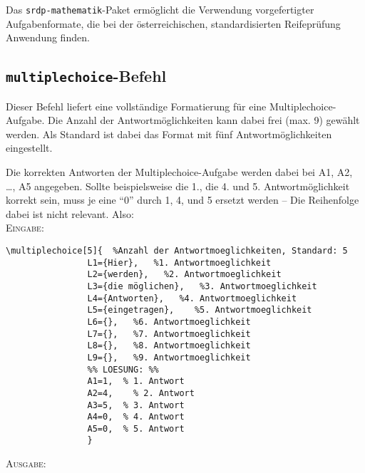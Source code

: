 \documentclass[a4paper,12pt]{article}
\begin{document}
Das \texttt{srdp-mathematik}-Paket ermöglicht die Verwendung vorgefertigter Aufgabenformate, die bei der österreichischen, standardisierten Reifeprüfung Anwendung finden.


\subsection{\texttt{multiplechoice}-Befehl}

Dieser Befehl liefert eine vollständige Formatierung für eine Multiplechoice-Aufgabe. Die Anzahl der Antwortmöglichkeiten kann dabei frei (max. 9) gewählt werden. Als Standard ist dabei das Format mit fünf Antwortmöglichkeiten eingestellt. \leer

Die korrekten Antworten der Multiplechoice-Aufgabe werden dabei bei A1, A2, \ldots, A5 angegeben. Sollte beispielsweise die 1., die 4. und 5. Antwortmöglichkeit korrekt sein, muss je eine "`0"' durch 1, 4, und 5 ersetzt werden -- Die Reihenfolge dabei ist nicht relevant. Also: \\

\textsc{Eingabe:}

\begin{verbatim}
\multiplechoice[5]{  %Anzahl der Antwortmoeglichkeiten, Standard: 5
				L1={Hier},   %1. Antwortmoeglichkeit 
				L2={werden},   %2. Antwortmoeglichkeit
				L3={die möglichen},   %3. Antwortmoeglichkeit
				L4={Antworten},   %4. Antwortmoeglichkeit
				L5={eingetragen},	 %5. Antwortmoeglichkeit
				L6={},	 %6. Antwortmoeglichkeit
				L7={},	 %7. Antwortmoeglichkeit
				L8={},	 %8. Antwortmoeglichkeit
				L9={},	 %9. Antwortmoeglichkeit
				%% LOESUNG: %%
				A1=1,  % 1. Antwort
				A2=4,	 % 2. Antwort
				A3=5,  % 3. Antwort
				A4=0,  % 4. Antwort
				A5=0,  % 5. Antwort
				}
\end{verbatim}

\textsc{Ausgabe:}\vspace{0.2cm}
\end{document}
